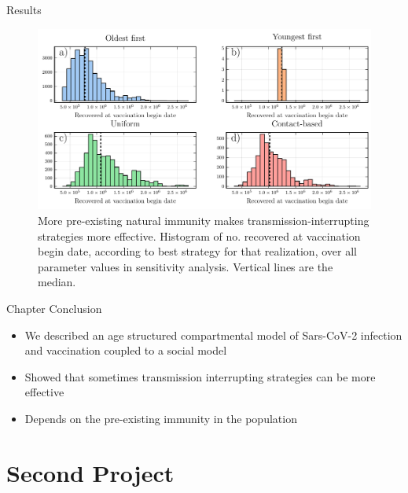 \documentclass{beamer}
\begin{document}
\begin{frame}{Results}
\begin{figure}
    \includegraphics[width = \textwidth]{covid/histograms.pdf}
    \caption{\small More pre-existing natural immunity makes transmission-interrupting strategies more effective. Histogram of no. recovered at vaccination begin date, according to best strategy for that realization, over all parameter values in sensitivity analysis. Vertical lines are the median.}
\end{figure}
\end{frame}
\begin{frame}{Chapter Conclusion}
    \begin{itemize}
        \item We described an age structured compartmental model of Sars-CoV-2 infection and vaccination coupled to a social model 
        \item Showed that sometimes transmission interrupting strategies can be more effective
        \item Depends on the pre-existing immunity in the population
    \end{itemize}
\end{frame}





\section{Second Project}
\end{document}
